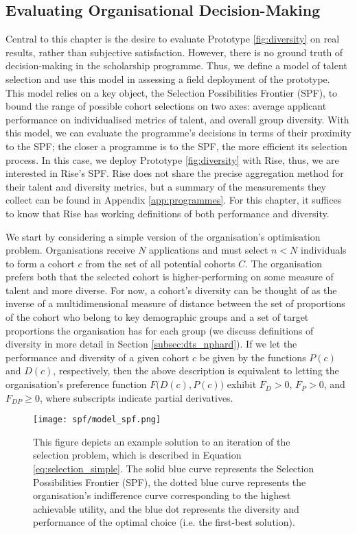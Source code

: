 \subsection{Evaluating Organisational Decision-Making}\label{ssec:measurement}
Central to this chapter is the desire to evaluate Prototype \ref{fig:diversity} on real results, rather than subjective satisfaction. However, there is no ground truth of decision-making in the scholarship programme. Thus, we define a model of talent selection and use this model in assessing a field deployment of the prototype. This model relies on a key object, the Selection Possibilities Frontier (SPF), to bound the range of possible cohort selections on two axes: average applicant performance on individualised metrics of talent, and overall group diversity. With this model, we can evaluate the programme's decisions in terms of their proximity to the SPF; the closer a programme is to the SPF, the more efficient its selection process. In this case, we deploy Prototype \ref{fig:diversity} with Rise, thus, we are interested in Rise's SPF. Rise does not share the precise aggregation method for their talent and diversity metrics, but a summary of the measurements they collect can be found in Appendix \ref{app:programmes}. For this chapter, it suffices to know that Rise has working definitions of both performance and diversity.

We start by considering a simple version of the organisation's optimisation problem. Organisations receive $N$ applications and must select $n<N$ individuals to form a cohort $c$ from the set of all potential cohorts $C$. The organisation prefers both that the selected cohort is higher-performing on some measure of talent and more diverse. For now, a cohort's diversity can be thought of as the inverse of a multidimensional measure of distance between the set of proportions of the cohort who belong to key demographic groups and a set of target proportions the organisation has for each group (we discuss definitions of diversity in more detail in Section \ref{subsec:dts_nphard}). If we let the performance and diversity of a given cohort $c$ be given by the functions $P(c)$ and $D(c)$, respectively, then the above description is equivalent to letting the organisation's preference function $F\Big(D(c),P(c)\Big)$ exhibit $F_D>0$, $F_P>0$, and $F_{DP}\geq0$, where subscripts indicate partial derivatives. 

\begin{figure}[htbp]
    \centering
    \caption{This figure depicts an example solution to an iteration of the selection problem, which is described in Equation \ref{eq:selection_simple}. The solid blue curve represents the Selection Possibilities Frontier (SPF), the dotted blue curve represents the organisation's indifference curve corresponding to the highest achievable utility, and the blue dot represents the diversity and performance of the optimal choice (i.e. the first-best solution). }
    \label{fig:model_spf}
    \texttt{[image: spf/model\_spf.png]} 
\end{figure}

